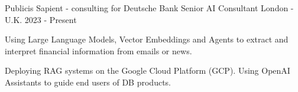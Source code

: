 


\begin{cventries}





\cventry
{Publicis Sapient - consulting for Deutsche Bank} %
{Senior AI Consultant} %
{London - U.K.} %
{2023 - Present} %
{ %
\begin{cvitems}
\item {Using Large Language Models, Vector Embeddings and Agents to extract and interpret financial information from emails or news.}
\item {Deploying RAG systems on the Google Cloud Platform (GCP). Using OpenAI Assistants to guide end users of DB products.}
\end{cvitems}
}


\end{cventries}
